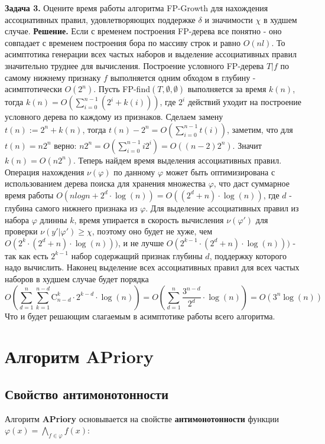 \newline\newline
\textbf{Задача 3.}
Оцените время работы алгоритма FP-Growth для нахождения ассоциативных правил, удовлетворяющих поддержке $\delta$ и значимости $\chi$ в худшем случае.
\newline\newline
\textbf{Решение.} 
\newline
Если с временем построения FP-дерева все понятно - оно совпадает с временем построения бора по массиву строк и равно $O(nl)$. То асимптотика генерации всех частых наборов и выделение ассоциативных правил значительно труднее для вычисления. Построение условного FP-дерева $T|f$ по самому нижнему признаку $f$ выполняется одним обходом в глубину - асимптотически $O(2^n)$. Пусть FP-find$(T,\emptyset,\emptyset)$ выполняется за время $k(n)$, тогда $k(n) = O\left(\sum_{i = 0}^{n-1} (2^i + k(i))\right)$, где $2^i$ действий уходит на построение условного дерева по каждому из признаков. Сделаем замену $t(n):=2^n+k(n)$, тогда $t(n) - 2^n = O\left(\sum_{i = 0}^{n-1}t(i)\right)$, заметим, что для $t(n) = n2^n$ верно: $n2^n = O\left(\sum_{i = 0}^{n-1} i2^i\right) = O((n-2)2^n)$. Значит $k(n) = O(n2^n)$. Теперь найдем время выделения ассоциативных правил. Операция нахождения $\nu(\varphi)$ по данному $\varphi$ может быть оптимизирована с использованием дерева поиска для хранения множества $\varphi$, что даст суммарное время работы $O(nlogn + 2^d\cdot \log(n)) = O((2^d + n)\cdot \log(n))$, где $d$ - глубина самого нижнего признака из $\varphi$. Для выделение ассоциативных правил из набора $\varphi$ длинны $k$, время упирается в скорость вычисления $\nu(\varphi')$ для проверки $\nu(y' | \varphi') \geq \chi$, поэтому оно будет не хуже, чем $O(2^k \cdot (2^d + n)\cdot \log(n)))$, и не лучше $O(2^{k-1} \cdot (2^d + n)\cdot \log(n)))$ - так как есть $2^{k-1}$ набор содержащий признак глубины $d$, поддержку которого надо вычислить. Наконец выделение всех ассоциативных правил для всех частых наборов в худшем случае будет порядка 
$$O\left(\sum_{d = 1}^{n} \sum_{k = 1}^{n-d} \mathrm{C}_{n-d}^{k} \cdot 2^{k-d}\cdot \log(n) \right) =
O\left(\sum_{d = 1}^{n} \frac{3^{n-d}}{2^d} \cdot\log(n) \right) =O(3^n \log(n))  $$
Что и будет решающим слагаемым в асимптотике работы всего алгоритма.


\section{Алгоритм APriory}

\subsection{Свойство антимонотонности}
Алгоритм \textbf{APriory} основывается на свойстве \textbf{антимонотонности} функции \( \varphi(x)= \bigwedge_{f \in \varphi} f(x)\):


